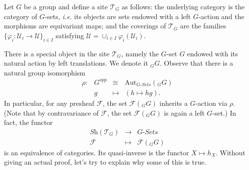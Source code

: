 \noindent
Let $G$ be a group and define a site $\mathcal{T}_G$ as follows: the underlying
category is the category of $G$-sets, {\it i.e.} its objects are sets endowed
with a left $G$-action and the morphisms are equivariant maps; and the
coverings of $\mathcal{T}_G$ are the families $\{\varphi_i : \mathcal{U}_i \to
\mathcal{U} \}_{i\in I}$ satisfying $\mathcal{U} = \cup_{i\in I} \varphi_i
(\mathcal{U}_i)$.

\medskip\noindent
There is a special object in the site $\mathcal{T}_G$, namely the $G$-set $G$
endowed with its natural action by left translations. We denote it ${}_G G$.
Observe that there is a natural group isomorphism
$$
\begin{matrix}
\rho: & G^{opp} & \cong & \text{Aut}_{G\textit{-Sets}}({}_G G) \\
& g & \longmapsto & (h \mapsto hg).
\end{matrix}
$$
In particular, for any presheaf $\mathcal{F}$, the set $\mathcal{F}({}_G G)$
inherits a $G$-action via $\rho$. (Note that by contravariance of
$\mathcal{F}$, the set $\mathcal{F}({}_G G)$ is again a left $G$-set.) In fact,
the functor
$$
\begin{matrix}
\textit{Sh}(\mathcal{T}_G) & \longrightarrow & G\textit{-Sets} \\
\mathcal{F} & \longmapsto & \mathcal{F}({}_G G)
\end{matrix}
$$
is an equivalence of categories. Its quasi-inverse is the functor $X \mapsto
h_X$. Without giving an actual proof, let's try to explain why some of this is
true.

